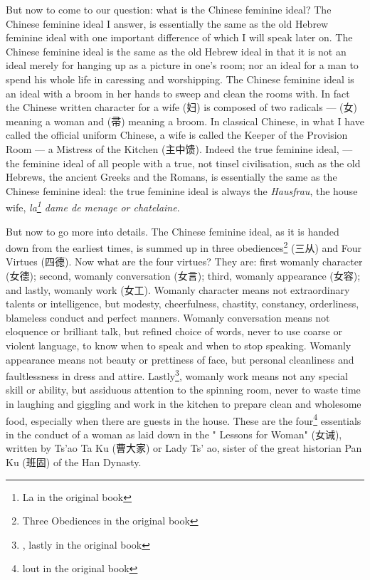 But now to come to our question: what is the Chinese feminine ideal? 
The Chinese feminine ideal I answer, is essentially the same as the old Hebrew feminine ideal with one important difference of which I will speak later on.
The Chinese feminine ideal is the same as the old Hebrew ideal in that it is not an ideal merely for hanging up as a picture in one's room; nor an ideal for a man to spend his whole life in caressing and worshipping.
The Chinese feminine ideal is an ideal with a broom in her hands to sweep and clean the rooms with.
In fact the Chinese written character for a wife (妇) is composed of two radicals --- (女) meaning a woman and (帚) meaning a broom.
In classical Chinese, in what I have called the official uniform Chinese, a wife is called the Keeper of the Provision Room --- a Mistress of the Kitchen (主中馈).
Indeed the true feminine ideal, --- the feminine ideal of all people with a true, not tinsel civilisation, such as the old Hebrews, the ancient Greeks and the Romans, is essentially the same as the Chinese feminine ideal: the true feminine ideal is always the \emph{Hausfrau}, the house wife, \emph{la\footnote{La in the original book} dame de menage or chatelaine}.

But now to go more into details.
The Chinese feminine ideal, as it is handed down from the earliest times, is summed up in three obediences\footnote{Three Obediences in the original book} (三从) and Four Virtues (四德). 
Now what are the four virtues?
They are: first womanly character (女德); second, womanly conversation (女言); third, womanly appearance (女容); and lastly, womanly work (女工).
Womanly character means not extraordinary talents or intelligence, but modesty, cheerfulness, chastity, constancy, orderliness, blameless conduct and perfect manners.
Womanly conversation means not eloquence or brilliant talk, but refined choice of words, never to use coarse or violent language, to know when to speak and when to stop speaking.
Womanly appearance means not beauty or prettiness of face, but personal cleanliness and faultlessness in dress and attire.
Lastly\footnote{, lastly in the original book}, womanly work means not any special skill or ability, but assiduous attention to the spinning room, never to waste time in laughing and giggling and work in the kitchen to prepare clean and wholesome food, especially when there are guests in the house.
These are the four\footnote{lout in the original book} essentials in the conduct of a woman as laid down in the " Lessons for Woman" (女诫), written by Ts'ao Ta Ku (曹大家) or Lady Ts' ao, sister of the great historian Pan Ku (班固) of the Han Dynasty.

